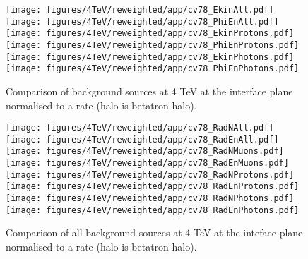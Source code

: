 \begin{figure}
\begin{center}
  \texttt{[image: figures/4TeV/reweighted/app/cv78\_EkinAll.pdf]}
  \texttt{[image: figures/4TeV/reweighted/app/cv78\_PhiEnAll.pdf]}
  \texttt{[image: figures/4TeV/reweighted/app/cv78\_EkinProtons.pdf]}
  \texttt{[image: figures/4TeV/reweighted/app/cv78\_PhiEnProtons.pdf]}
  \texttt{[image: figures/4TeV/reweighted/app/cv78\_EkinPhotons.pdf]}
  \texttt{[image: figures/4TeV/reweighted/app/cv78\_PhiEnPhotons.pdf]}
\end{center}
\vspace{-0.6cm}
 \caption{Comparison of background sources at 4 TeV at the interface plane normalised to a rate (halo is betatron halo).
  \label{compAllBKG4TeV_rates}}
\end{figure}

\begin{figure}
\begin{center}
  \texttt{[image: figures/4TeV/reweighted/app/cv78\_RadNAll.pdf]}
  \texttt{[image: figures/4TeV/reweighted/app/cv78\_RadEnAll.pdf]}
  \texttt{[image: figures/4TeV/reweighted/app/cv78\_RadNMuons.pdf]}
  \texttt{[image: figures/4TeV/reweighted/app/cv78\_RadEnMuons.pdf]}
  \texttt{[image: figures/4TeV/reweighted/app/cv78\_RadNProtons.pdf]}
  \texttt{[image: figures/4TeV/reweighted/app/cv78\_RadEnProtons.pdf]}
  \texttt{[image: figures/4TeV/reweighted/app/cv78\_RadNPhotons.pdf]}
  \texttt{[image: figures/4TeV/reweighted/app/cv78\_RadEnPhotons.pdf]}
\end{center}
\vspace{-0.6cm}
 \caption{Comparison of all background sources at 4 TeV at the inteface plane normalised to a rate (halo is betatron halo).
  \label{compAllBKG4TeV_rates2}}
\end{figure}




